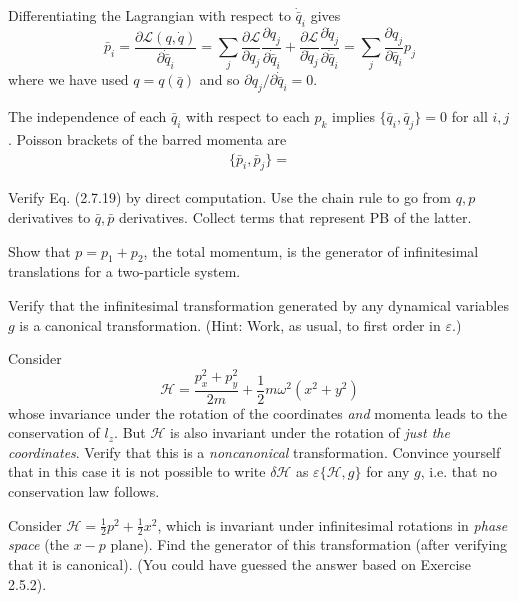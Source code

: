 \documentclass[../principles-of-quantum-mechanics.tex]{subfiles}
\begin{document}
\begin{questions}
\begin{solution}
			Differentiating the Lagrangian with respect to $\dot{\bar{q}}_i$ gives
			\[
				\bar{p}_i = \frac{\partial \mathcal{L}(q, \dot{q})}{\partial \dot{\bar{q}}_i} = \sum_j\frac{\partial\mathcal{L}}{\partial q_j}\frac{\partial q_j}{\partial \dot{\bar{q}}_i} + \frac{\partial \mathcal{L}}{\partial \dot{q}_j}\frac{\partial \dot{q}_j}{\partial \dot{\bar{q}}_i} = \sum_j\frac{\partial q_j}{\partial \bar{q}_i}p_j
			\]
			where we have used $q = q(\bar{q})$ and so $\partial q_j / \partial \dot{\bar{q}}_i = 0$.
			
			The independence of each $\bar{q}_i$ with respect to each $p_k$ implies $\{\bar{q}_i, \bar{q}_j\} = 0$ for all $i, j$. Poisson brackets of the barred momenta are
			\begin{align*}
				\{\bar{p}_i, \bar{p}_j\} = 
			\end{align*}
		\end{solution}
		
		\question Verify Eq. (2.7.19) by direct computation. Use the chain rule to go from $q, p$ derivatives to $\bar{q}, \bar{p}$ derivatives. Collect terms that represent PB of the latter.
		
		\question Show that $p = p_1 + p_2$, the total momentum, is the generator of infinitesimal translations for a two-particle system.
		
		\question Verify that the infinitesimal transformation generated by any dynamical variables $g$ is a canonical transformation. (Hint: Work, as usual, to first order in $\varepsilon$.)
		
		\question Consider
		\[
			\mathcal{H} = \frac{p_x^2 + p_y^2}{2m} + \frac{1}{2}m\omega^2(x^2+y^2)
		\]
		whose invariance under the rotation of the coordinates \textit{and} momenta leads to the conservation of $l_z$. But $\mathcal{H}$ is also invariant under the rotation of \textit{just the coordinates}. Verify that this is a \textit{noncanonical} transformation. Convince yourself that in this case it is not possible to write $\delta\mathcal{H}$ as $\varepsilon\{\mathcal{H}, g\}$ for any $g$, i.e. that no conservation law follows.
		
		\question Consider $\mathcal{H} = \frac{1}{2}p^2 + \frac{1}{2}x^2$, which is invariant under infinitesimal rotations in \textit{phase space} (the $x-p$ plane). Find the generator of this transformation (after verifying that it is canonical). (You could have guessed the answer based on Exercise 2.5.2).
		

\end{questions}
\end{document}
